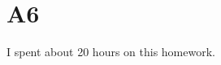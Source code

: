 \documentclass{article}
\begin{document}
\section*{A6}

\vfill
\begin{center}
    I spent about 20 hours on this homework.
\end{center}
\vfill
\end{document}
